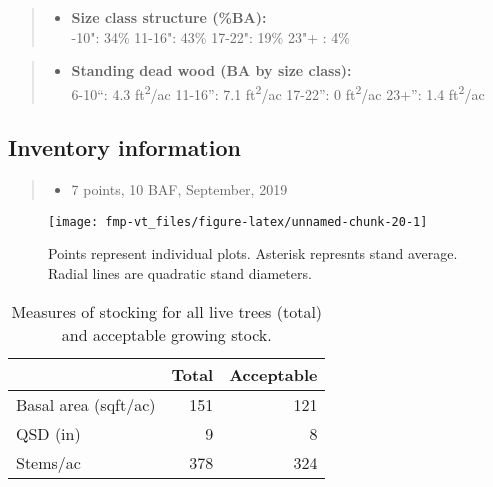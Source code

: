 \documentclass[]{tufte-handout}
\providecommand{\tightlist}{%
  \setlength{\itemsep}{0pt}\setlength{\parskip}{0pt}}
\begin{document}
\begin{quote}
\begin{itemize}
\tightlist
\item
  \textbf{Size class structure (\%BA):}\\
  \vspace{2pt} -10": 34\% \textbar{} 11-16": 43\% \textbar{}
  17-22": 19\% \textbar{} 23"+ : 4\%
\end{itemize}
\end{quote}

\begin{quote}
\begin{itemize}
\tightlist
\item
  \textbf{Standing dead wood (BA by size class):}\\
  \vspace{2pt} \indent \small 6-10``: 4.3 ft\textsuperscript{2}/ac
  \textbar{} 11-16'': 7.1 ft\textsuperscript{2}/ac \textbar{} 17-22'': 0
  ft\textsuperscript{2}/ac \textbar{} 23+'': 1.4
  ft\textsuperscript{2}/ac
\end{itemize}
\end{quote}

\subsection{Inventory information}\label{inventory-information-3}

\begin{quote}
\begin{itemize}
\tightlist
\item
  7 points, 10 BAF, September, 2019
\end{itemize}
\end{quote}

\begin{figure}
\texttt{[image: fmp-vt\_files/figure-latex/unnamed-chunk-20-1]} \caption[Points represent individual plots]{Points represent individual plots. Asterisk represnts stand average. Radial lines are quadratic stand diameters.}\label{fig:unnamed-chunk-20}
\end{figure}

\begin{table}

\caption{\label{tab:unnamed-chunk-21}Measures of stocking for all live trees (total) and acceptable growing stock.}
\centering
\begin{tabular}[t]{lrr}
\toprule
  & Total & Acceptable\\
\midrule
Basal area (sqft/ac) & 151 & 121\\
QSD (in) & 9 & 8\\
Stems/ac & 378 & 324\\
\bottomrule
\end{tabular}
\end{table}
\end{document}
